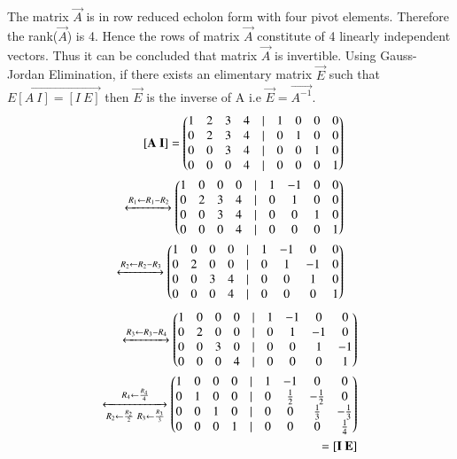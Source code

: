 The matrix $\vec{A}$ is in row reduced echolon form with four pivot elements. Therefore the
rank($\vec{A}$) is 4. Hence the rows of matrix $\vec{A}$ constitute of 4 linearly independent
vectors. Thus it can be concluded that matrix $\vec{A}$ is invertible. Using Gauss-Jordan Elimination,
if there exists an elimentary matrix $\vec{E}$ such that $\vec{E[A \ I]=[I \ E]}$ then $\vec{E}$ is the inverse of A i.e $\vec{E}=\vec{A^{-1}}$.
\begin{align}
	\mathbf{[A \ I]} = \begin{pmatrix} 1 & 2 & 3 & 4 &| & 1 & 0 & 0 & 0 \\
				0 & 2 & 3 & 4 &| & 0 & 1 & 0 & 0 \\
				0 & 0 & 3 & 4 &| & 0 & 0 & 1 & 0 \\
				0 & 0 & 0 & 4 &| & 0 & 0 & 0 & 1 \end{pmatrix}\\
			\xleftrightarrow[]{R_1 \leftarrow R_1 - R_2}
			\begin{pmatrix} 1 & 0 & 0 & 0 &| & 1 & -1 & 0 & 0 \\
                                0 & 2 & 3 & 4 &| & 0 & 1 & 0 & 0 \\
                                0 & 0 & 3 & 4 &| & 0 & 0 & 1 & 0 \\
                                0 & 0 & 0 & 4 &| & 0 & 0 & 0 & 1 \end{pmatrix}\\
			\xleftrightarrow[]{R_2 \leftarrow R_2 - R_3}
                        \begin{pmatrix} 1 & 0 & 0 & 0 &| & 1 & -1 & 0 & 0 \\
                                0 & 2 & 0 & 0 &| & 0 & 1 & -1 & 0 \\
                                0 & 0 & 3 & 4 &| & 0 & 0 & 1 & 0 \\
                                0 & 0 & 0 & 4 &| & 0 & 0 & 0 & 1 \end{pmatrix}
\end{align}
\begin{align}
			\xleftrightarrow[]{R_3 \leftarrow R_3 - R_4}
                        \begin{pmatrix} 1 & 0 & 0 & 0 &| & 1 & -1 & 0 & 0 \\
                                0 & 2 & 0 & 0 &| & 0 & 1 & -1 & 0 \\
                                0 & 0 & 3 & 0 &| & 0 & 0 & 1 & -1 \\
                                0 & 0 & 0 & 4 &| & 0 & 0 & 0 & 1 \end{pmatrix}\\
\xleftrightarrow[R_2 \leftarrow \frac{R_2}{2} \ R_3 \leftarrow \frac{R_3}{3}]
		{R_4 \leftarrow \frac{R_4}{4}}
                \begin{pmatrix} 1 & 0 & 0 & 0 &| & 1 & -1 & 0 & 0 \\
			0 & 1 & 0 & 0 &| & 0 & \frac{1}{2} & -\frac{1}{2} & 0 \\
			0 & 0 & 1 & 0 &| & 0 & 0 & \frac{1}{3} & -\frac{1}{3} \\
			0 & 0 & 0 & 1 &| & 0 & 0 & 0 & \frac{1}{4}\end{pmatrix}\nonumber \\ 
			= \mathbf{[I \ E]}
\end{align}
